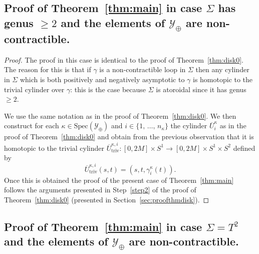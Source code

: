 \documentclass[AHL,Unicode,longabstracts,published]{cedram}
\newcommand{\Spec}{\mathrm{Spec}}
\newcommand{\rtriv}{\mathrm{triv}}
\newcommand{\clY}{\mathcal{Y}}
\begin{document}
\subsection{Proof of Theorem~\ref{thm:main} in case \texorpdfstring{$\Sigma$}{Sigma} has genus \texorpdfstring{$\geq 2$}{>= 2} and the elements of \texorpdfstring{$\clY_\oplus$}{Y(+) } are non-contractible.}


\begin{proof}
The proof in this case is identical to the proof of Theorem~\ref{thm:disk0}. The reason for this is that if $\gamma$ is a non-contractible loop in $\Sigma$ then any cylinder in $\Sigma$ which is both positively and negatively asymptotic to $\gamma$ is homotopic to the trivial cylinder over $\gamma$: this is the case because $\Sigma$ is atoroidal since it has genus $\geq 2$.

We use the same notation as in the proof of Theorem~\ref{thm:disk0}. We then construct for each $\kappa \in \Spec(\clY_\oplus)$ and $i\in
\{1,\,\ldots,\,n_\kappa\}$ the cylinder $\overline{U}^\kappa_i$ as in the proof of Theorem~\ref{thm:disk0} and obtain from the previous observation that it is homotopic to the trivial cylinder $\overline{U}^{\kappa,i}_{\rtriv}:[0,2M] \times S^1 \to [0,2M] \times S^1 \times S^2 $ defined by
\[
\overline{U}^{\kappa,i}_{\rtriv}(s,t) = (s,t, \gamma^\kappa_i(t)).
\]
Once
this is obtained the proof of the present case of Theorem~\ref{thm:main} follows the arguments presented in Step~\ref{step2} of the proof of Theorem~\ref{thm:disk0} (presented in Section~\ref{sec:proofthmdisk}). 
\end{proof}


\subsection{Proof of Theorem~\ref{thm:main} in case \texorpdfstring{$\Sigma = T^2$}{Sigma = T2} and the elements of \texorpdfstring{$\clY_\oplus$}{Y(+) } are non-contractible.}
\end{document}
